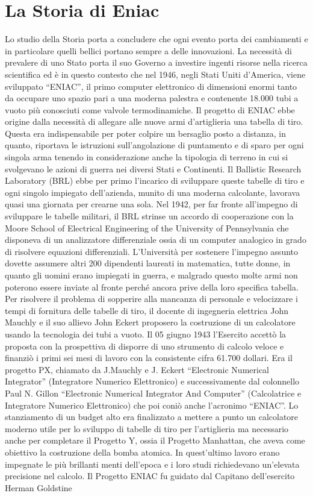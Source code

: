 \section*{La Storia di Eniac}
\indent

Lo studio della Storia porta a concludere che ogni evento porta dei cambiamenti e in particolare quelli bellici portano sempre a delle innovazioni. La necessità di prevalere di uno Stato porta il suo Governo a investire ingenti risorse nella ricerca scientifica ed è in questo contesto che nel 1946, negli Stati Uniti d’America, viene sviluppato “ENIAC”, il primo computer elettronico di dimensioni enormi tanto da occupare uno spazio pari a una moderna palestra e contenente 18.000 tubi a vuoto più conosciuti come valvole termodinamiche. Il progetto di ENIAC ebbe origine dalla necessità di allegare alle nuove armi d’artiglieria una tabella di tiro. Questa era indispensabile per poter colpire un bersaglio posto a distanza, in quanto, riportava le istruzioni sull’angolazione di puntamento e di sparo per ogni singola arma tenendo in considerazione anche la tipologia di terreno in cui si svolgevano le azioni di guerra nei diversi Stati e Continenti. Il Ballistic Research Laboratory (BRL) ebbe per primo l’incarico di sviluppare queste tabelle di tiro e ogni singolo impiegato dell’azienda, munito di una moderna calcolante, lavorava quasi una giornata per crearne una sola. Nel 1942, per far fronte all’impegno di sviluppare le tabelle militari, il BRL strinse un accordo di cooperazione con la Moore School of Electrical Engineering of the University of Pennsylvania che disponeva di un analizzatore differenziale ossia di un computer analogico in grado di risolvere equazioni differenziali. L’Università per sostenere l’impegno assunto dovette assumere altri 200 dipendenti laureati in matematica, tutte donne, in quanto gli uomini erano impiegati in guerra, e malgrado questo molte armi non poterono essere inviate al fronte perché ancora prive della loro specifica tabella. Per risolvere il problema di sopperire alla mancanza di personale e velocizzare i tempi di fornitura delle tabelle di tiro, il docente di ingegneria elettrica John Mauchly e il suo allievo John Eckert proposero la costruzione di un calcolatore usando la tecnologia dei tubi a vuoto. Il 05 giugno 1943 l’Esercito accettò la proposta con la prospettiva di disporre di uno strumento di calcolo veloce e finanziò i primi sei mesi di lavoro con la consistente cifra 61.700 dollari. Era il progetto PX, chiamato da J.Mauchly e J. Eckert “Electronic Numerical Integrator” (Integratore Numerico Elettronico) e successivamente dal colonnello Paul N. Gillon “Electronic Numerical Integrator And Computer” (Calcolatrice e Integratore Numerico Elettronico) che poi coniò anche l’acronimo “ENIAC”. Lo stanziamento di un budget alto era finalizzato a mettere a punto un calcolatore moderno utile per lo sviluppo di tabelle di tiro per l’artiglieria ma necessario anche per completare il Progetto Y, ossia il Progetto Manhattan, che aveva come obiettivo la costruzione della bomba atomica. In quest’ultimo lavoro erano impegnate le più brillanti menti dell’epoca e i loro studi richiedevano un’elevata precisione nel calcolo. Il Progetto ENIAC fu guidato dal Capitano dell’esercito Herman Goldstine 